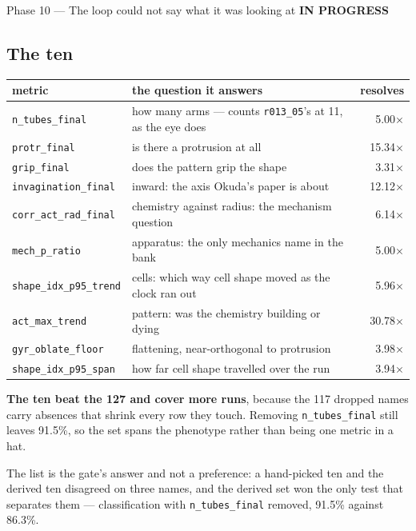 \documentclass[11pt,a4paper]{article}
\newcommand{\code}[1]{\texttt{#1}}
\newcommand{\prog}{\textcolor{warn}{\textbf{IN PROGRESS}}}
\begin{document}
\begin{phasebox}{Phase 10 --- The loop could not say what it was looking at \hfill \prog}
\subsection*{The ten}
\begin{center}\small
\begin{tabular}{@{}llr@{}}
\toprule
metric & the question it answers & resolves \\
\midrule
\code{n\_tubes\_final}       & how many arms --- counts \code{r013\_05}'s at 11, as the eye does & 5.00$\times$ \\
\code{protr\_final}          & is there a protrusion at all & 15.34$\times$ \\
\code{grip\_final}           & does the pattern grip the shape & 3.31$\times$ \\
\code{invagination\_final}   & inward: the axis Okuda's paper is about & 12.12$\times$ \\
\code{corr\_act\_rad\_final} & chemistry against radius: the mechanism question & 6.14$\times$ \\
\code{mech\_p\_ratio}        & apparatus: the only mechanics name in the bank & 5.00$\times$ \\
\code{shape\_idx\_p95\_trend}& cells: which way cell shape moved as the clock ran out & 5.96$\times$ \\
\code{act\_max\_trend}       & pattern: was the chemistry building or dying & 30.78$\times$ \\
\code{gyr\_oblate\_floor}    & flattening, near-orthogonal to protrusion & 3.98$\times$ \\
\code{shape\_idx\_p95\_span} & how far cell shape travelled over the run & 3.94$\times$ \\
\bottomrule
\end{tabular}
\end{center}

\noindent \textbf{The ten beat the 127 and cover more runs}, because the 117 dropped names carry
absences that shrink every row they touch. Removing \code{n\_tubes\_final} still leaves 91.5\%, so
the set spans the phenotype rather than being one metric in a hat.

The list is the gate's answer and not a preference: a hand-picked ten and the derived ten disagreed
on three names, and the derived set won the only test that separates them --- classification with
\code{n\_tubes\_final} removed, 91.5\% against 86.3\%.


\end{phasebox}
\end{document}
